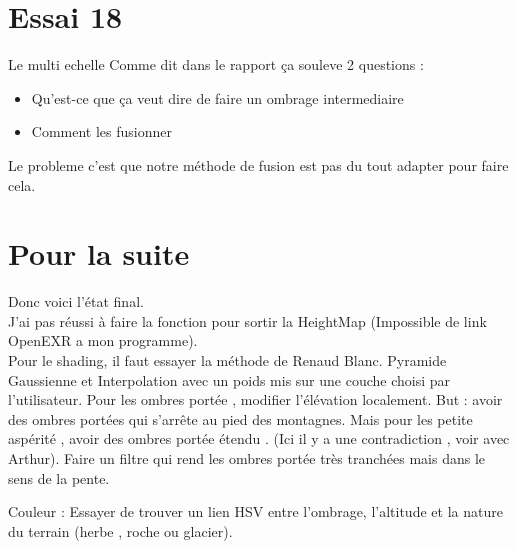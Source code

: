 \documentclass[a4paper]{article}
\begin{document}
\section{Essai 18}
Le multi echelle
Comme dit dans le rapport ça souleve 2 questions :
\begin{itemize}
\item Qu'est-ce que ça veut dire de faire un ombrage intermediaire
\item Comment les fusionner
\end{itemize}


Le probleme c'est que notre méthode de fusion est pas du tout adapter pour faire cela.


\section{Pour la suite}

Donc voici l'état final.\\
J'ai pas réussi à faire la fonction pour sortir la HeightMap (Impossible de link OpenEXR a mon programme).  \\
Pour le shading, il faut essayer la méthode de Renaud Blanc. Pyramide Gaussienne et Interpolation avec un poids mis sur une couche choisi par l'utilisateur.
Pour les ombres portée , modifier l'élévation localement. But : avoir des ombres portées qui s’arrête au pied des montagnes. Mais pour les petite aspérité , avoir des ombres portée étendu . (Ici il y a une contradiction , voir avec Arthur). Faire un filtre qui rend les ombres portée très tranchées mais dans le sens de la pente. 

Couleur : Essayer de trouver un lien HSV entre l'ombrage, l'altitude et la nature du terrain (herbe , roche ou glacier). 



 
\end{document}
